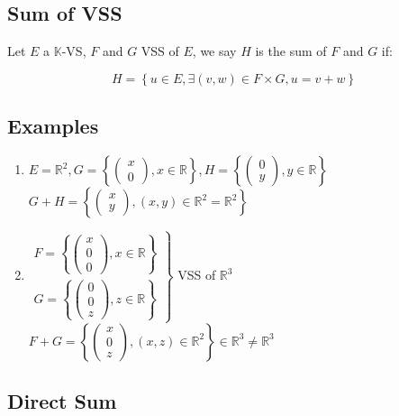 \documentclass[notitlepage]{math}
\begin{document}
\subsection{Sum  of VSS}
Let $E$ a $\mathbb{K}$-VS, $F$ and $G$ VSS of $E$, we say $H$ is the sum of $F$ and $G$ if:

\[H = \left\{u \in E, \exists (v,w)  \in F \times G, u = v + w \right\}\]
\subsection{Examples}
\begin{enumerate}
    \item $ E = \mathbb{R}^2, G = \left\{ \begin{pmatrix}
        x \\ 0 \end{pmatrix}, x \in \mathbb{R} \right\}, 
        H = \left\{ \begin{pmatrix} 0 \\ y \end{pmatrix}, y \in \mathbb{R} \right\}$ \\
        $ G + H = \left\{ \begin{pmatrix} x \\ y \end{pmatrix}, (x,y) \in \mathbb{R}^2 = \mathbb{R}^2 \right\}$
    \item $\left. \begin{matrix} 
        F = \left\{ \begin{pmatrix} x \\ 0 \\ 0 \end{pmatrix},x \in \mathbb{R}   \right\}\\
        G = \left\{ \begin{pmatrix} 0 \\ 0 \\ z \end{pmatrix},z \in \mathbb{R}   \right\}
    \end{matrix} \right\}$ VSS of $\mathbb{R}^3$ \\
    $F+G  = \left\{ \begin{pmatrix} x \\ 0 \\ z \end{pmatrix},(x,z) \in \mathbb{R}^2  \right\} \in \mathbb{R}^3 \ne \mathbb{R}^3$
\end{enumerate}
\subsection{Direct Sum}
\end{document}
